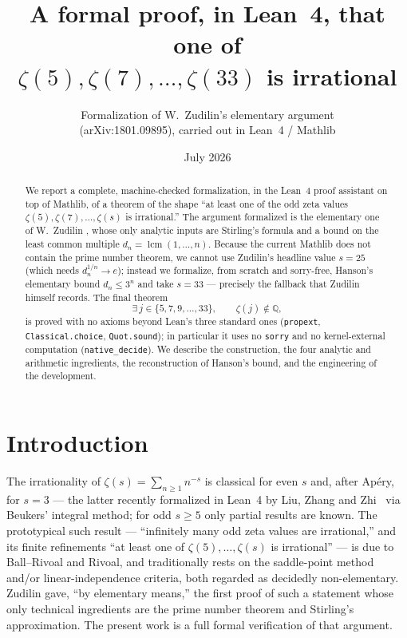 \documentclass[11pt]{article}
\title{A formal proof, in Lean~4, that one of\\
  $\zeta(5),\zeta(7),\dots,\zeta(33)$ is irrational}
\author{Formalization of W.~Zudilin's elementary argument\\
  \small(arXiv:1801.09895), carried out in Lean~4 / Mathlib}
\date{July 2026}
\theoremstyle{definition}
\DeclareMathOperator{\lcm}{lcm}
\newcommand{\Q}{\mathbb{Q}}
\newcommand{\code}[1]{\texttt{#1}}
\begin{document}
\maketitle

\begin{abstract}
We report a complete, machine-checked formalization, in the Lean~4 proof
assistant on top of Mathlib, of a theorem of the shape ``at least one of the
odd zeta values $\zeta(5),\zeta(7),\dots,\zeta(s)$ is irrational.'' The
argument formalized is the elementary one of W.~Zudilin
\cite{Zudilin2018}, whose only analytic inputs are Stirling's formula and a
bound on the least common multiple $d_n=\lcm(1,\dots,n)$. Because the current
Mathlib does not contain the prime number theorem, we cannot use Zudilin's
headline value $s=25$ (which needs $d_n^{1/n}\to e$); instead we formalize,
from scratch and sorry-free, Hanson's elementary bound $d_n\le 3^n$ and take
$s=33$ --- precisely the fallback that Zudilin himself records. The final
theorem
\[
  \exists\, j\in\{5,7,9,\dots,33\},\qquad \zeta(j)\notin\Q,
\]
is proved with no axioms beyond Lean's three standard ones
(\code{propext}, \code{Classical.choice}, \code{Quot.sound}); in particular it
uses no \code{sorry} and no kernel-external computation
(\code{native\_decide}). We describe the construction, the four analytic and
arithmetic ingredients, the reconstruction of Hanson's bound, and the
engineering of the development.
\end{abstract}

\tableofcontents

\section{Introduction}

The irrationality of $\zeta(s)=\sum_{n\ge1}n^{-s}$ is classical for even $s$
and, after Ap\'ery, for $s=3$ --- the latter recently formalized in Lean~4 by
Liu, Zhang and Zhi~\cite{LiuZhangZhi2025} via Beukers' integral method; for odd
$s\ge5$ only partial results are known.
The prototypical such result --- ``infinitely many odd zeta values are
irrational,'' and its finite refinements ``at least one of
$\zeta(5),\dots,\zeta(s)$ is irrational'' --- is due to Ball--Rivoal
\cite{BallRivoal} and Rivoal, and traditionally rests on the saddle-point
method and/or linear-independence criteria, both regarded as decidedly
non-elementary. Zudilin \cite{Zudilin2018} gave, ``by elementary means,'' the
first proof of such a statement whose only technical ingredients are the prime
number theorem and Stirling's approximation. The present work is a full formal
verification of that argument.
\end{document}
